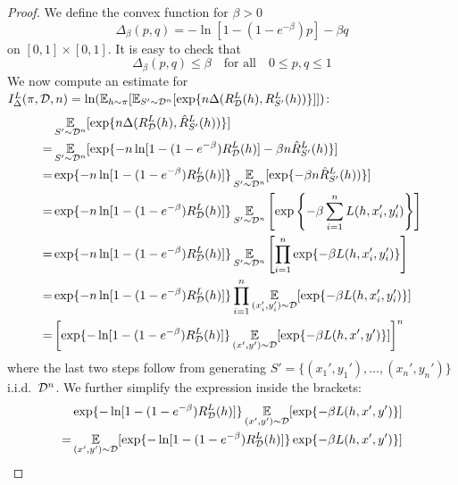 \begin{proof}
  We define the convex function for $\beta > 0$
  \begin{equation}
    \Delta_\beta(p, q) = -\ln[1 - (1 - e^{-\beta}) p] - \beta q
  \end{equation}
  on $[0, 1] \times [0, 1]$. It is easy to check that
  \begin{equation}
    \Delta_\beta(p, q) \leq \beta \quad \text{for all} \quad 0 \leq p, q \leq 1  
  \end{equation}
  We now compute an estimate for $I_\Delta^L(\pi, \mathcal{D}, n) = \ln(\operatorname*{\mathbb{E}}_{h \sim
  \pi}[\operatorname*{\mathbb{E}}_{S' \sim \mathcal{D}^n}[\exp\{n \Delta(R_{\mathcal{D}}^L(h), R_{S'}^L(h))\}]])$:
  \begin{equation}
    \begin{split}
      &\operatorname*{\mathbb{E}}_{S' \sim \mathcal{D}^n}[\exp\{n \Delta(R_{\mathcal{D}}^L(h), \hat{R}_{S'}^L(h))\}] \\
      =& \operatorname*{\mathbb{E}}_{S' \sim \mathcal{D}^n}[\exp\{- n \ln[1 - (1 - e^{-\beta}) R_{\mathcal{D}}^L(h)] -
      \beta n \hat{R}_{S'}^L(h)\}] \\
      =& \exp\{- n \ln[1 - (1 - e^{-\beta}) R_{\mathcal{D}}^L(h)]\} \operatorname*{\mathbb{E}}_{S' \sim
      \mathcal{D}^n}[\exp\{-\beta n \hat{R}_{S'}^L(h))\}] \\
      =& \exp\{- n \ln[1 - (1 - e^{-\beta}) R_{\mathcal{D}}^L(h)]\} \operatorname*{\mathbb{E}}_{S' \sim
      \mathcal{D}^n}\left[\exp\left\{-\beta \sum_{i = 1}^n L(h, x_i',
      y_i')\right\}\right] \\
      =& \exp\{- n \ln[1 - (1 - e^{-\beta}) R_{\mathcal{D}}^L(h)]\} \operatorname*{\mathbb{E}}_{S' \sim
      \mathcal{D}^n}\left[\prod_{i = 1}^n \exp\{-\beta L(h, x_i', y_i')\}\right] \\
      =& \exp\{- n \ln[1 - (1 - e^{-\beta}) R_{\mathcal{D}}^L(h)]\} \prod_{i = 1}^n
      \operatorname*{\mathbb{E}}_{(x_i', y_i') \sim \mathcal{D}}[\exp\{-\beta L(h, x_i', y_i')\}] \\
      =& \left[\exp\{- \ln[1 - (1 - e^{-\beta}) R_{\mathcal{D}}^L(h)]\} \operatorname*{\mathbb{E}}_{(x', y') \sim
      \mathcal{D}}[\exp\{-\beta L(h, x', y')\}]\right]^n
    \end{split}
  \end{equation}
  where the last two steps follow from generating $S' = \{(x_1', y_1'), \ldots,
  (x_n', y_n')\}$ i.i.d.\ $\mathcal{D}^n$. We further simplify the expression inside the
  brackets:
  \begin{equation}
    \begin{split}
      &\exp\{- \ln[1 - (1 - e^{-\beta}) R_\CD^L(h)]\} \Ev_{(x', y') \sim
      \CD}[\exp\{-\beta L(h, x', y')\}] \\
      =& \Ev_{(x', y') \sim \CD}[\exp\{- \ln[1 - (1 - e^{-\beta}) R_\CD^L(h)]\}
      \exp\{-\beta L(h, x', y')\}] \\

\end{split}
\end{equation}
\end{proof}

